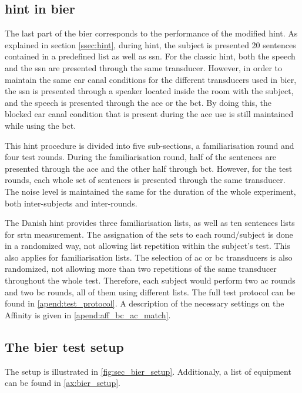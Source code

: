 \subsection{\gls{hint} in \gls{bier}}\label{ssec:hint_in_bier}
The last part of the \gls{bier} corresponds to the performance of the modified \gls{hint}. As explained in section \autoref{ssec:hint}, during \gls{hint}, the subject is presented 20 sentences contained in a predefined list as well as \gls{ssn}. For the classic \gls{hint}, both the speech and the \gls{ssn} are presented through the same transducer. However, in order to maintain the same ear canal conditions for the different transducers used in \gls{bier}, the \gls{ssn} is presented through a speaker located inside the room with the subject, and the speech is presented through the  \gls{ace} or the \gls{bct}. By doing this, the blocked ear canal condition that is present during the \gls{ace} use is still maintained while using the \gls{bct}.

This \gls{hint} procedure is divided into five sub-sections, a familiarisation round and four test rounds. During the familiarisation round, half of the sentences are presented through the \gls{ace} and the other half through \gls{bct}. However, for the test rounds, each whole set of sentences is presented through the same transducer. The noise level is maintained the same for the duration of the whole experiment, both inter-subjects and inter-rounds.

The Danish \gls{hint} provides three familiarisation lists, as well as ten sentences lists for \gls{srtn} measurement. The assignation of the sets to each round/subject is done in a randomized way, not allowing list repetition within the subject's test. This also applies for familiarisation lists. The selection of \gls{ac} or \gls{bc} transducers is also randomized, not allowing more than two repetitions of the same transducer throughout the whole test. Therefore, each subject would perform two \gls{ac} rounds and two \gls{bc} rounds, all of them using different lists. The full test protocol can be found in \autoref{apend:test_protocol}. A description of the necessary settings on the Affinity is given in \autoref{apend:aff_bc_ac_match}.


\subsection{The \gls{bier} test setup}
The setup is illustrated in \autoref{fig:sec_bier_setup}.
Additionaly, a list of equipment can be found in \autoref{ax:bier_setup}.

